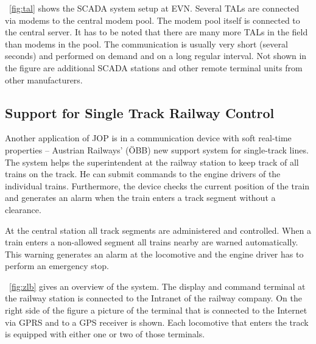 \figurename~\ref{fig:tal} shows the SCADA system setup at EVN.
Several TALs are connected via modems to the central modem pool. The
modem pool itself is connected to the central server. It has to be
noted that there are many more TALs in the field than modems in the
pool. The communication is usually very short (several seconds) and
performed on demand and on a long regular interval. Not shown in the
figure are additional SCADA stations and other remote terminal units
from other manufacturers.

\subsection{Support for Single Track Railway Control}

Another application of JOP is in a communication device with soft
real-time properties -- Austrian Railways' (\"OBB) new support system
for single-track lines. The system helps the superintendent at the
railway station to keep track of all trains on the track. He can
submit commands to the engine drivers of the individual trains.
Furthermore, the device checks the current position of the train and
generates an alarm when the train enters a track segment without a
clearance.

At the central station all track segments are administered and
controlled. When a train enters a non-allowed segment all trains
nearby are warned automatically. This warning generates an alarm at
the locomotive and the engine driver has to perform an emergency
stop.

\figurename~\ref{fig:zlb} gives an overview of the system. The
display and command terminal at the railway station is connected to
the Intranet of the railway company. On the right side of the figure
a picture of the terminal that is connected to the Internet via GPRS
and to a GPS receiver is shown. Each locomotive that enters the track
is equipped with either one or two of those terminals.

